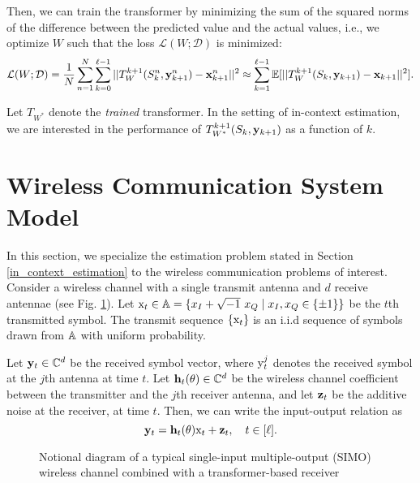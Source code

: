 \documentclass[journal,letterpaper,onecolumn]{IEEEtran}
\begin{document}
Then, we can train the transformer by minimizing the sum of the squared norms of the difference between the predicted value and the actual values, i.e., we optimize $W$ such that the loss $\mathcal{L}(W; \mathcal{D})$ is minimized:
\begin{equation}
\label{eq:loss_function}
     \mathcal{L}(W; \mathcal{D}) = \frac{1}{N} \sum_{n=1}^N \sum_{k=0}^{\ell-1} ||T_W^{k+1}(S_k^n, {\mathbf{y}}_{k+1}^n) - {\mathbf{x}}_{k+1}^n||^2 \approx \sum_{k=1}^{\ell-1}\mathbb{E}[||T^{k+1}_W(S_{k}, {\mathbf{y}}_{k+1}) - {\mathbf{x}}_{k+1}||^2].
\end{equation}

Let $T_{W^*}$ denote the \emph{trained} transformer. In the setting of in-context estimation, we are interested in the performance of $T_{W^*}^{k+1}(S_k, {\mathbf{y}}_{k+1})$ as a function of $k$.

\section{Wireless Communication System Model}
\label{wireless_communication_problem}

In this section, we specialize the estimation problem stated in Section \ref{in_context_estimation} to the wireless communication problems of interest.
Consider a wireless channel with a single transmit antenna and $d$ receive antennae (see Fig. \ref{fig:TranEstimator}). Let ${\textnormal{x}}_t \in {\mathbb{A}} = \{x_I+ \sqrt{-1} \ x_Q  \mid x_I, x_Q\in\{\pm 1\}\}$ be the $t$th transmitted symbol.
The transmit sequence $\{{\textnormal{x}}_t\}$ is an i.i.d sequence of symbols drawn from ${\mathbb{A}}$ with uniform probability.

Let ${\mathbf{y}}_t \in {\mathbb{C}}^d$ be the received symbol vector, where ${\textnormal{y}}^j_t$ denotes the received symbol at the $j$th antenna at time $t$. 
Let ${\mathbf{h}}_t(\theta) \in{\mathbb{C}}^d$ be the wireless channel coefficient between the transmitter and the $j$th receiver antenna, and let ${\mathbf{z}}_t$ be the additive noise at the receiver, at time $t$. 
Then, we can write the input-output relation as
\begin{equation}
\label{eq:io_relation}
    {\mathbf{y}}_t = {\mathbf{h}}_t(\theta) {\textnormal{x}}_t + {\mathbf{z}}_t, \quad t\in[\ell].
\end{equation}




\begin{figure}[ht]
\centering

\caption{Notional diagram of a typical single-input multiple-output (SIMO) wireless channel combined with a transformer-based receiver}
\label{fig:TranEstimator}
\end{figure}
\end{document}
